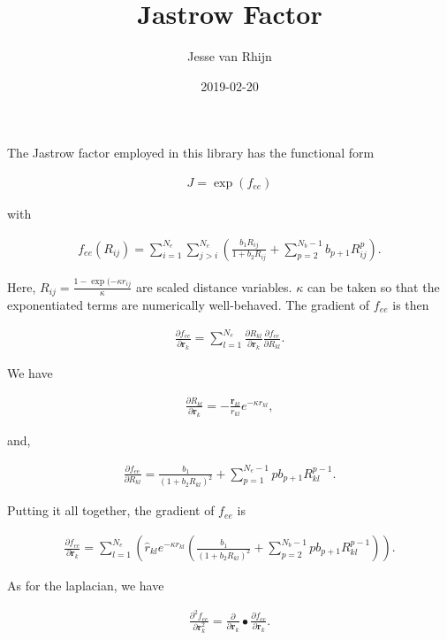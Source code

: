 \documentclass{article}
\title{Jastrow Factor}
\author{Jesse van Rhijn}
\date{2019-02-20}
\begin{document}
\maketitle

The Jastrow factor employed in this library has the functional form

\begin{align}
  J = \exp(f_{ee})
\end{align}

with 

\begin{align}
  f_{ee}(R_{ij}) = \sum_{i=1}^{N_e}\sum_{j > i}^{N_e} 
    \left( \frac{b_1 R_{ij}}{1 + b_2 R_{ij}} + \sum_{p=2}^{N_b - 1} b_{p+1}R_{ij}^p \right).
\end{align}

Here, $R_{ij} = \frac{1 - \exp(-\kappa r_{ij}}{\kappa}$ are scaled distance
variables. $\kappa$ can be taken so that the exponentiated terms are
numerically well-behaved. The gradient of $f_{ee}$ is then

\begin{align}
  \frac{\partial f_{ee}}{\partial\mathbf{r}_k} = \sum_{l=1}^{N_e}
    \frac{\partial R_{kl}}{\partial\mathbf{r}_{k}}
    \frac{\partial f_{ee}}{\partial R_{kl}}.
\end{align}

We have

\begin{align}
  \frac{\partial R_{kl}}{\partial\mathbf{r}_k} = -\frac{\mathbf{r}_{kl}}{r_{kl}} e^{-\kappa r_{kl}},
\end{align}

and,

\begin{align}
  \frac{\partial f_{ee}}{\partial R_{kl}} = \frac{b_1}{(1 + b_2 R_{kl})^2} + \sum_{p=1}^{N_e - 1}
    pb_{p+1}R_{kl}^{p-1}.
\end{align}

Putting it all together, the gradient of $f_{ee}$ is

\begin{align}
  \frac{\partial f_{ee}}{\partial \mathbf{r}_k} = \sum_{l=1}^{N_e} \left( \hat{r}_{kl}e^{-\kappa r_{kl}} 
    \left( \frac{b_1}{(1 + b_2R_{kl})^2} + \sum_{p=2}^{N_b - 1} pb_{p+1}R_{kl}^{p-1}\right)\right).
\end{align}

As for the laplacian, we have

\begin{align}
  \frac{\partial^2 f_{ee}}{\partial \mathbf{r}_k^2} = \frac{\partial}{\partial \mathbf{r}_k} 
    \bullet \frac{\partial f_{ee}}{\partial \mathbf{r}_k}.
\end{align}
\end{document}
